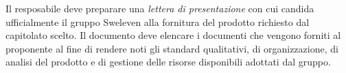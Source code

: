 Il resposabile %
deve preparare una \emph{lettera di presentazione} con cui candida ufficialmente il gruppo Sweleven alla fornitura del prodotto richiesto dal capitolato scelto. Il documento deve elencare i documenti che vengono forniti al proponente al fine di rendere noti gli standard qualitativi, di organizzazione, di analisi del prodotto e di gestione delle risorse disponibili adottati dal gruppo.